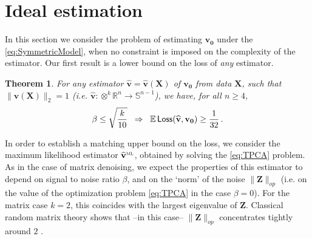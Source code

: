 \documentclass[11pt]{article}
\newtheorem{theorem}{Theorem}
\theoremstyle{definition}
\def\sML{\mbox{\tiny\sc ML}}
\def\Loss{{\sf Loss}}
\def\E{{\mathbb E}} %
\def\reals{\mathbb{R}}
\def\hbv{\mathbf{\widehat{v}}}
\def\bvz{\mathbf{v_0}}
\def\bX{\mathbf{X}}
\def\bZ{\mathbf{Z}}
\def\bbS{\mathbb{S}}
\def\E{\mathbb{E}}
\begin{document}
\section{Ideal estimation}\label{sec:infoTheoryandUpperBounds}

In this section we consider the problem of estimating $\bvz$ under the
 \ref{eq:SymmetricModel}, when no constraint is
imposed on the complexity of the estimator. Our first result is a
lower bound on the loss of \emph{any} estimator. 
%
\begin{theorem}\label{th:infoTheoretic}
For any estimator $\hbv=\hbv(\bX)$  of $\bvz$ from data
$\bX$, such that $\|\hbv(\bX)\|_2=1$ (i.e. $\hbv : \otimes^k \reals^n \to
    \bbS^{n-1}$), we have, for all $n\ge 4$,
%
\begin{align}
%
\beta\le \sqrt{\frac{k}{10}}\;\;\Rightarrow\;\;
\E\,\Loss(\hbv,\bvz)\ge \frac{1}{32}\, .
%
\end{align}
%
\end{theorem}
%
%
In order to establish a matching upper bound on the loss, we consider the
maximum likelihood estimator $\hbv^{\sML}$, obtained by solving the \ref{eq:TPCA}
problem.
As in the case of matrix denoising, we expect the properties of
this estimator to depend on signal to noise ratio $\beta$, and on the
`norm' of the noise
$\|\bZ\|_{op}$ (i.e. on the value of the optimization problem
\ref{eq:TPCA} in the case $\beta=0$). 
For the matrix case $k=2$, this coincides with the largest eigenvalue of
$\bZ$. Classical  random matrix theory shows that --in this case--
$\|\bZ\|_{op}$ concentrates tightly around $2$
\cite{Geman,Szarek:survey,BaiSilverstein}.
\end{document}
